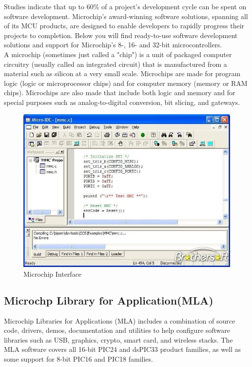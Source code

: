 \documentclass[twoside,a4paper,16pt]{book}
\begin{document}
{Studies indicate that up to 60\% of a project’s development cycle can be spent on software development. Microchip’s award-winning software solutions, spanning all of its MCU products, are designed to enable developers to rapidly progress their projects to completion. Below you will find ready-to-use software development solutions and support for Microchip’s 8-, 16- and 32-bit microcontrollers.\\
A microchip (sometimes just called a "chip") is a unit of packaged computer circuitry (usually called an integrated circuit) that is manufactured from a material such as silicon at a very small scale. Microchips are made for program logic (logic or microprocessor chips) and for computer memory (memory or RAM chips). Microchips are also made that include both logic and memory and for special purposes such as analog-to-digital conversion, bit slicing, and gateways.
 \begin{figure}[ht!]
	\begin{center}
		\includegraphics[width=15.0cm]{3.jpeg}
		\caption{Microchip Interface}
	\end{center}
\end{figure}


\subsection*{Microchp Library for Application(MLA)}
Microchip Libraries for Applications (MLA) includes a combination of source code, drivers, demos, documentation and utilities to help configure software libraries such as USB, graphics, crypto, smart card, and wireless stacks. The MLA software covers all 16-bit PIC24 and dsPIC33 product families, as well as some support for 8-bit PIC16 and PIC18 families.\\
}
\end{document}
